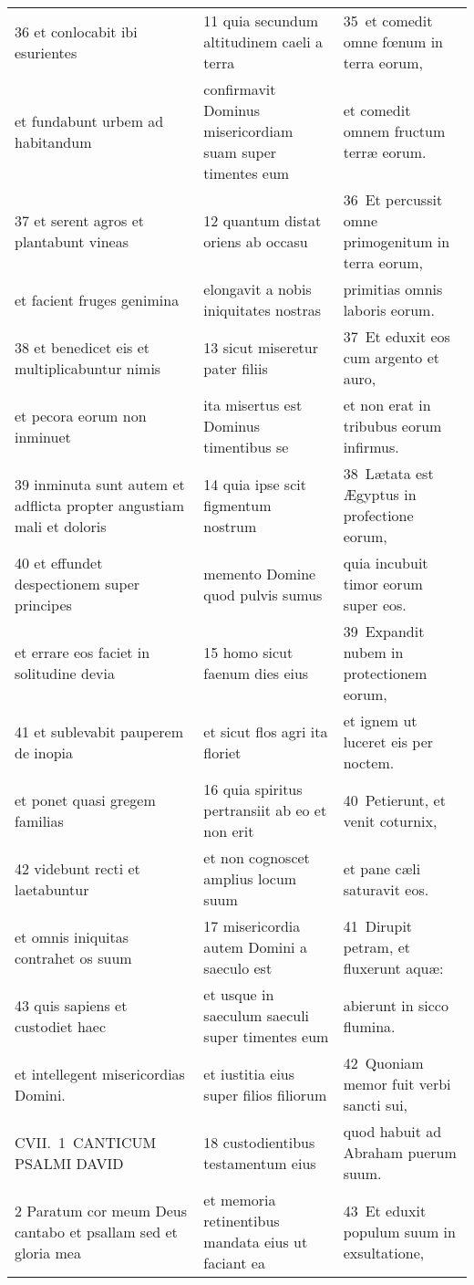 \documentclass{article}
\begin{document}
\begin{longtable}{@{}p{}p{}p{}@{}}
36 et conlocabit ibi esurientes	&	11 quia secundum altitudinem caeli a terra	&	35 et comedit omne fœnum in terra eorum,	\\
et fundabunt urbem ad habitandum	&	confirmavit Dominus misericordiam suam super timentes eum	&	et comedit omnem fructum terræ eorum.	\\
37 et serent agros et plantabunt vineas	&	12 quantum distat oriens ab occasu	&	36 Et percussit omne primogenitum in terra eorum,	\\
et facient fruges genimina	&	elongavit a nobis iniquitates nostras	&	primitias omnis laboris eorum.	\\
38 et benedicet eis et multiplicabuntur nimis	&	13 sicut miseretur pater filiis	&	37 Et eduxit eos cum argento et auro,	\\
et pecora eorum non inminuet	&	ita misertus est Dominus timentibus se	&	et non erat in tribubus eorum infirmus.	\\
39 inminuta sunt autem et adflicta propter angustiam mali et doloris	&	14 quia ipse scit figmentum nostrum	&	38 Lætata est Ægyptus in profectione eorum,	\\
40 et effundet despectionem super principes	&	memento Domine quod pulvis sumus	&	quia incubuit timor eorum super eos.	\\
et errare eos faciet in solitudine devia	&	15 homo sicut faenum dies eius	&	39 Expandit nubem in protectionem eorum,	\\
41 et sublevabit pauperem de inopia	&	et sicut flos agri ita floriet	&	et ignem ut luceret eis per noctem.	\\
et ponet quasi gregem familias	&	16 quia spiritus pertransiit ab eo et non erit	&	40 Petierunt, et venit coturnix,	\\
42 videbunt recti et laetabuntur	&	et non cognoscet amplius locum suum	&	et pane cæli saturavit eos.	\\
et omnis iniquitas contrahet os suum	&	17 misericordia autem Domini a saeculo est	&	41 Dirupit petram, et fluxerunt aquæ:	\\
43 quis sapiens et custodiet haec	&	et usque in saeculum saeculi super timentes eum	&	abierunt in sicco flumina.	\\
et intellegent misericordias Domini.	&	et iustitia eius super filios filiorum	&	42 Quoniam memor fuit verbi sancti sui,	\\
CVII. 1 CANTICUM PSALMI DAVID	&	18 custodientibus testamentum eius	&	quod habuit ad Abraham puerum suum.	\\
2 Paratum cor meum Deus cantabo et psallam sed et gloria mea	&	et memoria retinentibus mandata eius ut faciant ea	&	43 Et eduxit populum suum in exsultatione,	\\

\end{longtable}
\end{document}
